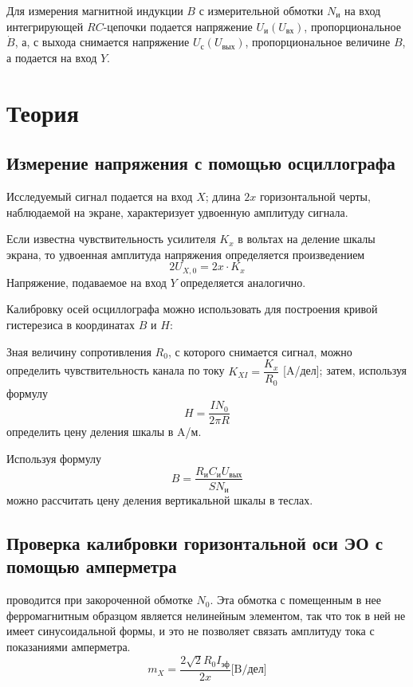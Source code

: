 \documentclass[a4paper, 12pt]{article}%
\begin{document}
Для измерения магнитной индукции $B$ с измерительной обмотки $N_{\text{и}}$ на вход интегрирующей $RC$-цепочки подается напряжение $U_{\text{и}}(U_{\text{вх}})$, пропорциональное $\dot{B}$, а, с выхода снимается напряжение $U_{\text{с}}(U_{\text{вых}})$, пропорциональное величине $B$, а подается на вход $Y$.

\section*{Теория}
\subsection*{Измерение напряжения с помощью осциллографа}
Исследуемый сигнал подается на вход $X$; длина $2x$ горизонтальной черты, наблюдаемой на экране, характеризует удвоенную амплитуду сигнала. 

Если известна чувствительность усилителя $K_x$ в вольтах на деление шкалы экрана, то удвоенная амплитуда напряжения определяется произведением
\[2U_{X, 0} = 2x \cdot K_x\]
Напряжение, подаваемое на вход $Y$ определяется аналогично. 

Калибровку осей осциллографа можно использовать для построения кривой гистерезиса в координатах $B$ и $H$:

Зная величину сопротивления $R_0$, с которого снимается сигнал, можно определить чувствительность канала по току $K_{XI} = \dfrac{K_x}{R_0}$ [A/дел]; затем, используя формулу 
\begin{equation}
H = \dfrac{IN_0}{2\pi R}
\end{equation}
определить цену деления шкалы в A/м.

Используя формулу 
\begin{equation}
B = \dfrac{R_{\text{и}}C_{\text{и}}U_{\text{вых}}}{SN_{\text{и}}}
\end{equation}
можно рассчитать цену деления вертикальной шкалы в теслах.
\subsection*{Проверка калибровки горизонтальной оси ЭО с помощью амперметра}
проводится при закороченной обмотке $N_0$. Эта обмотка с помещенным в нее ферромагнитным образцом является нелинейным элементом, так что ток в ней не имеет синусоидальной формы, и это не позволяет связать амплитуду тока с показаниями амперметра.
\begin{equation}
m_X = \dfrac{2 \sqrt{2} R_0 I_{\text{эф}}}{2x} \text{[B/дел]}
\end{equation}
\end{document}
